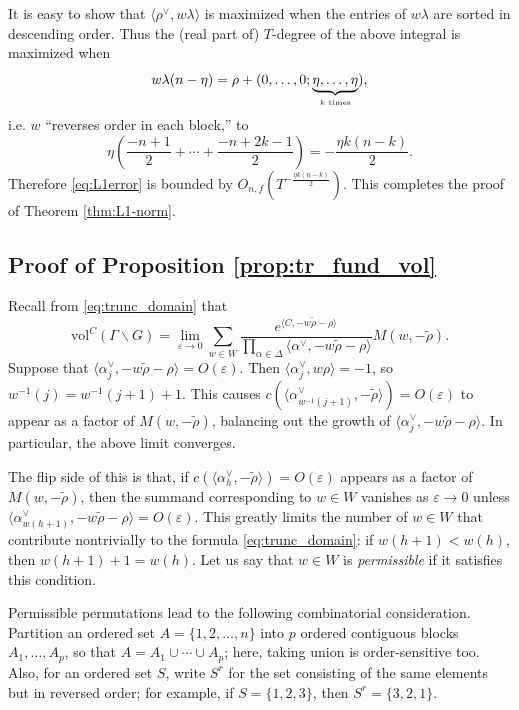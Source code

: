 \documentclass[11pt]{amsart}
\numberwithin{theorem}{section}
\numberwithin{equation}{section}
\theoremstyle{remark}
\theoremstyle{definition}
\newcommand{\vol}{\mathrm{vol}}
\begin{document}
It is easy to show that $\langle \rho^\vee,w\lambda\rangle$ is maximized when the entries of $w\lambda$ are sorted in descending order. Thus the (real part of) $T$-degree of the above integral is maximized when
\begin{equation*}
w\lambda(n-\eta) = \rho +(0,\ldots,0;\underbrace{\eta,\ldots,\eta}_{\mbox{\tiny $k$ times}}),
\end{equation*}
i.e. $w$ ``reverses order in each block,'' to
\begin{equation*}
\eta \left(\frac{-n+1}{2} + \cdots + \frac{-n+2k-1}{2}\right) = -\frac{\eta k(n-k)}{2}.
\end{equation*}
Therefore \eqref{eq:L1error} is bounded by $O_{n,f}(T^{-\frac{\eta k(n-k)}{2}})$. This completes the proof of Theorem \ref{thm:L1-norm}.

\subsection{Proof of Proposition \ref{prop:tr_fund_vol}}

Recall from \eqref{eq:trunc_domain} that
\begin{equation*}
\vol^C(\Gamma\backslash G)=\lim_{\varepsilon \rightarrow 0}\sum_{w \in W} \frac{e^{\langle C, -w\tilde\rho-\rho\rangle}}{\prod_{\alpha \in \Delta} \langle \alpha^\vee, -w\tilde\rho-\rho \rangle}M(w,-\tilde\rho).
\end{equation*}
Suppose that $\langle \alpha^\vee_j,-w\tilde\rho-\rho\rangle = O(\varepsilon)$. Then $\langle \alpha^\vee_j, w\rho\rangle = -1$, so $w^{-1}(j) = w^{-1}(j+1)+1$. This causes $c(\langle \alpha^\vee_{w^{-1}(j+1)}, -\tilde\rho\rangle) = O(\varepsilon)$ to appear as a factor of $M(w,-\tilde\rho)$, balancing out the growth of $\langle \alpha^\vee_j,-w\tilde\rho-\rho\rangle$. In particular, the above limit converges.

The flip side of this is that, if $c(\langle \alpha^\vee_h, -\tilde\rho\rangle) = O(\varepsilon)$ appears as a factor of $M(w,-\tilde\rho)$, then the summand corresponding to $w\in W$ vanishes as $\varepsilon\rightarrow0$ unless $\langle \alpha^\vee_{w(h+1)},-w\tilde\rho-\rho\rangle=O(\varepsilon)$. This greatly limits the number of $w\in W$ that contribute nontrivially to the formula \eqref{eq:trunc_domain}: if $w(h+1) < w(h)$, then $w(h+1)+1=w(h)$. Let us say that $w \in W$ is \emph{permissible} if it satisfies this condition.

Permissible permutations lead to the following combinatorial consideration. Partition an ordered set $A=\{1,2,\ldots,n\}$ into $p$ ordered contiguous blocks $A_1,\ldots,A_p$, so that $A=A_1\cup \cdots \cup A_p$; here, taking union is order-sensitive too. Also, for an ordered set $S$, write $S^r$ for the set consisting of the same elements but in reversed order; for example, if $S= \{1,2,3\}$, then $S^r =\{3,2,1\}$.
\end{document}
